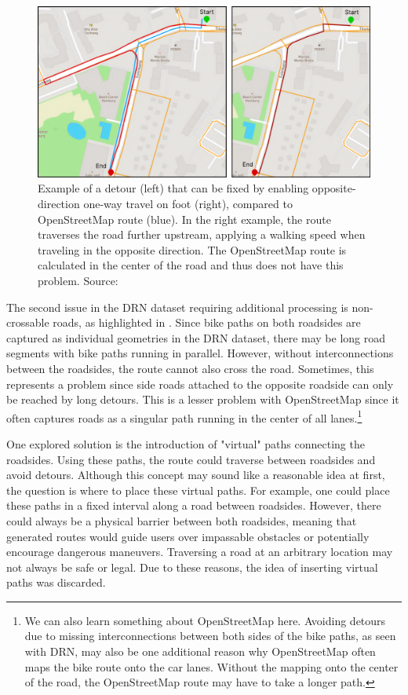 \begin{figure}[t]
\centering
\includegraphics[width=\linewidth]{images/oneway-travel-fix.pdf}
\caption{Example of a detour (left) that can be fixed by enabling opposite-direction one-way travel on foot (right), compared to OpenStreetMap route (blue). In the right example, the route traverses the road further upstream, applying a walking speed when traveling in the opposite direction. The OpenStreetMap route is calculated in the center of the road and thus does not have this problem. Source: \cite{lorenz_2022}}
\label{fig:oneway-travel-fix}
\end{figure}

The second issue in the DRN dataset requiring additional processing is non-crossable roads, as highlighted in . Since bike paths on both roadsides are captured as individual geometries in the DRN dataset, there may be long road segments with bike paths running in parallel. However, without interconnections between the roadsides, the route cannot also cross the road. Sometimes, this represents a problem since side roads attached to the opposite roadside can only be reached by long detours. This is a lesser problem with OpenStreetMap since it often captures roads as a singular path running in the center of all lanes.\footnote{We can also learn something about OpenStreetMap here. Avoiding detours due to missing interconnections between both sides of the bike paths, as seen with DRN, may also be one additional reason why OpenStreetMap often maps the bike route onto the car lanes. Without the mapping onto the center of the road, the OpenStreetMap route may have to take a longer path.}

One explored solution is the introduction of "virtual" paths connecting the roadsides. Using these paths, the route could traverse between roadsides and avoid detours. Although this concept may sound like a reasonable idea at first, the question is where to place these virtual paths. For example, one could place these paths in a fixed interval along a road between roadsides. However, there could always be a physical barrier between both roadsides, meaning that generated routes would guide users over impassable obstacles or potentially encourage dangerous maneuvers. Traversing a road at an arbitrary location may not always be safe or legal. Due to these reasons, the idea of inserting virtual paths was discarded.

